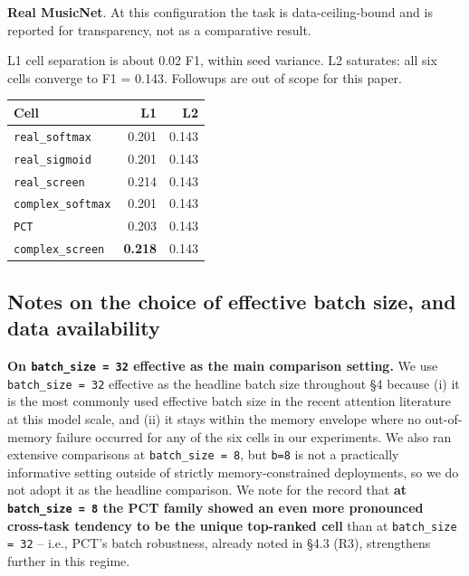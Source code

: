 \documentclass[11pt,a4paper]{article}
\theoremstyle{plain}
\theoremstyle{definition}
\begin{document}
\noindent
\begin{minipage}[t]{0.60\textwidth}
\vspace{0pt}
\textbf{Real MusicNet}. At this configuration the task is data-ceiling-bound and is reported for transparency, not as a comparative result.

L1 cell separation is about 0.02 F1, within seed variance. L2 saturates: all six cells converge to F1 = 0.143. Followups are out of scope for this paper.
\end{minipage}\hfill
\begin{minipage}[t]{0.31\textwidth}
\vspace{0pt}
\centering
{\footnotesize
\setlength{\tabcolsep}{4pt}
\renewcommand{\arraystretch}{1.08}
\begin{tabular}{|l|r|r|}
\hline
Cell & L1 & L2 \\
\hline
\texttt{real\_softmax} & 0.201 & 0.143 \\
\hline
\texttt{real\_sigmoid} & 0.201 & 0.143 \\
\hline
\texttt{real\_screen} & 0.214 & 0.143 \\
\hline
\texttt{complex\_softmax} & 0.201 & 0.143 \\
\hline
\texttt{PCT} & 0.203 & 0.143 \\
\hline
\texttt{complex\_screen} & \textbf{0.218} & 0.143 \\
\hline
\end{tabular}}
\captionsetup{skip=2pt}
\end{minipage}
\par\medskip

\subsection{Notes on the choice of effective batch size, and data availability}
\textbf{On \texttt{batch\_size = 32} effective as the main comparison setting.} We use \texttt{batch\_size = 32} effective as the headline batch size throughout \S{}4 because (i) it is the most commonly used effective batch size in the recent attention literature at this model scale, and (ii) it stays within the memory envelope where no out-of-memory failure occurred for any of the six cells in our experiments. We also ran extensive comparisons at \texttt{batch\_size = 8}, but \texttt{b=8} is not a practically informative setting outside of strictly memory-constrained deployments, so we do not adopt it as the headline comparison. We note for the record that \textbf{at \texttt{batch\_size = 8} the PCT family showed an even more pronounced cross-task tendency to be the unique top-ranked cell} than at \texttt{batch\_size = 32} -- i.e., PCT's batch robustness, already noted in \S{}4.3 (R3), strengthens further in this regime.
\end{document}
